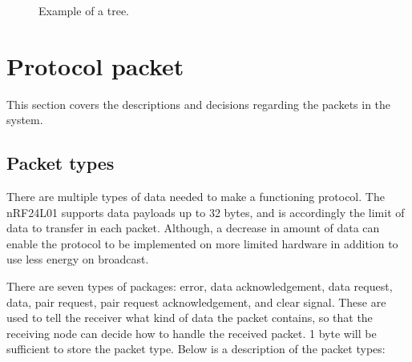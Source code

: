 \begin{figure}[!h]
	\centering
	\caption{Example of a tree.}
	\label{fig:prottree1}
\end{figure}








\section{Protocol packet}
This section covers the descriptions and decisions regarding the packets in the system.


\subsection{Packet types}
There are multiple types of data needed to make a functioning protocol. The nRF24L01 supports data payloads up to 32 bytes, and is accordingly the limit of data to transfer in each packet.
Although, a decrease in amount of data can enable the protocol to be implemented on more limited hardware in addition to use less energy on broadcast.

There are seven types of packages: error, data acknowledgement, data request, data, pair request, pair request acknowledgement, and clear signal.
These are used to tell the receiver what kind of data the packet contains, so that the receiving node can decide how to handle the received packet. 1 byte will be sufficient to store the packet type.
Below is a description of the packet types:


